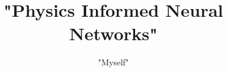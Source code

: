 \documentclass{article}
\begin{document}
\author{"Myself"}
\title{"Physics Informed Neural Networks"}
\maketitle 






{}

\end{document}
